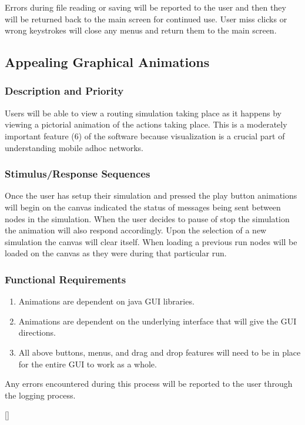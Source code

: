 \documentclass[a4paper,11pt,titlepage]{article}
\begin{document}
\begin{description}[\breaklabel]
  \item[Errors]  Errors during file reading or saving will be reported to the user and then they
will be returned back to the main screen for continued use. User miss clicks or wrong
keystrokes will close any menus and return them to the main screen.
\end{description}

\subsection{Appealing Graphical Animations}
\subsubsection{Description and Priority}
Users will be able to view a routing simulation taking place as it happens by viewing a
pictorial animation of the actions taking place. This is a moderately important feature
(6) of the software because visualization is a crucial part of understanding mobile adhoc
networks.
\subsubsection{Stimulus/Response Sequences}
Once the user has setup their simulation and pressed the play button animations will
begin on the canvas indicated the status of messages being sent between nodes in
the simulation. When the user decides to pause of stop the simulation the animation
will also respond accordingly. Upon the selection of a new simulation the canvas will
clear itself. When loading a previous run nodes will be loaded on the canvas as they
were during that particular run.
\subsubsection{Functional Requirements}
\begin{enumerate}[{\bf {REQ} 1}]
  \item Animations are dependent on java GUI libraries.
  \item Animations are dependent on the underlying interface that will give the GUI
  directions.
  \item All above buttons, menus, and drag and drop features will need to be in place
for the entire GUI to work as a whole.
\end{enumerate}

\begin{description}[\breaklabel]
  \item[Errors] Any errors encountered during this process will be reported to the user through
the logging process.
\end{description}[\breaklabel]
\end{document}
